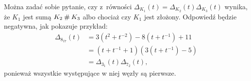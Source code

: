 Można zadać sobie pytanie, czy z~równości $\Delta_{K_1}(t) = \Delta_{K_2}(t) \Delta_{K_3}(t)$ wynika, że $K_1$ jest sumą $K_2 \mathbin{\#} K_3$ albo chociaż czy $K_1$ jest złożony.
Odpowiedź będzie negatywna, jak pokazuje przykład:
\begin{align}
    \Delta_{8_{17}}(t) & = 3(t^2 +t^{-2}) -8(t+t^{-1}) + 11 \\
    & = (t+t^{-1} + 1) (3(t+t^{-1}) - 5) \\
    & = \Delta_{3_1}(t) \Delta_{7_2}(t),
\end{align}
ponieważ wszystkie występujące w niej węzły są pierwsze.


